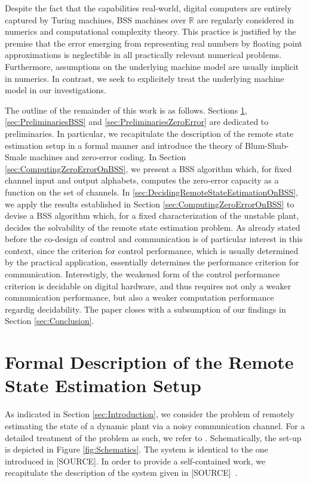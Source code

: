 \documentclass[conference]{IEEEtran}
\def\RR{{\mathbb R}}
\newcommand{\sdummy}{{\color{red}[SOURCE]}}
\begin{document}
	Despite the fact that the capabilities real-world, digital computers are 
	entirely captured by Turing machines, BSS machines over \(\RR\) are regularly considered in numerics and computational complexity theory. 
	This practice is justified by the premise that the error emerging from representing real numbers by floating point approximations is neglectible in all practically relevant numerical problems. 
	Furthermore, assumptions on the underlying machine model are usually implicit in numerics. In contrast, we seek to explicitely treat the underlying machine model in our investigations.

	The outline of the remainder of this work is as follows. Sections \ref{sec:FormalEstimationSetup}, \ref{sec:PreliminariesBSS} and \ref{sec:PreliminariesZeroError} are dedicated to preliminaries. 
	In particular, we recapitulate the description of the remote state estimation setup in a formal manner and introduce the theory of Blum-Shub-Smale machines and zero-error coding.
	In Section \ref{sec:ComputingZeroErrorOnBSS}, we present a BSS algorithm which, for fixed channel input and output alphabets, computes the zero-error capacity as a function on 
	the set of channels. In \ref{sec:DecidingRemoteStateEstimationOnBSS}, we apply the results established in Section \ref{sec:ComputingZeroErrorOnBSS} to devise a BSS algorithm
	which, for a fixed characterization of the unstable plant, decides the solvability of the remote state estimation problem. 
	As already stated before the co-design of control and communication is of particular interest in this context, since the criterion for control performance, which is
	usually determined by the practical application, essentially determines the performance criterion for communication. Interestigly, the weakened form of the control performance criterion 
	is decidable on digital hardware, and thus requires not only a weaker communication performance, but also a weaker computation performance regardig decidability. 
	The paper closes with a subsumption of 
	our findings in Section \ref{sec:Conclusion}.
                                                                        
\section{Formal Description of the Remote State Estimation Setup}	\label{sec:FormalEstimationSetup}
	\noindent As indicated in Section \ref{sec:Introduction}, we consider the problem of remotely estimating the state of a dynamic plant via a noisy communication channel. 
	For a detailed treatment of the problem as such, we refer to \cite{MS07}. Schematically, the set-up is depicted in Figure \ref{fig:Schematics}. 
	The system is identical to the one introduced in \sdummy. In order to provide a self-contained work, we recapitulate the description of the system given in \sdummy~.
\end{document}
